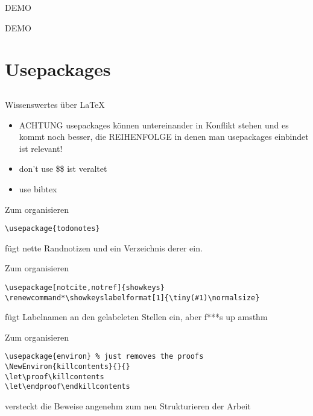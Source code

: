 \documentclass{beamer}
\begin{document}
\begin{frame}{DEMO}
    \begin{center}
        \Huge DEMO
    \end{center}
\end{frame}

\section{Usepackages}
\label{sec:usepackages}

\subsection{}
\begin{frame}{Wissenswertes über LaTeX}
    \begin{itemize}
        \item ACHTUNG usepackages können untereinander in Konflikt stehen und es kommt
              noch besser, die REIHENFOLGE in denen man usepackages einbindet ist
              relevant!
        \item  don't use \$\$ ist veraltet
        \item  use bibtex
    \end{itemize}
\end{frame}

\begin{frame}[fragile]{Zum organisieren}
    \footnotesize
    \begin{verbatim}
\usepackage{todonotes}
\end{verbatim}
    \normalsize
    fügt nette Randnotizen und ein Verzeichnis derer ein.
\end{frame}

\begin{frame}[fragile]{Zum organisieren}
    \footnotesize
    \begin{verbatim}
\usepackage[notcite,notref]{showkeys}
\renewcommand*\showkeyslabelformat[1]{\tiny(#1)\normalsize}
    \end{verbatim}
    \normalsize
fügt Labelnamen an den gelabeleten Stellen ein, aber f***s up amsthm
\end{frame}

\begin{frame}[fragile]{Zum organisieren}
    \footnotesize
    \begin{verbatim}
\usepackage{environ} % just removes the proofs
\NewEnviron{killcontents}{}{}
\let\proof\killcontents
\let\endproof\endkillcontents
    \end{verbatim}
    \normalsize
versteckt die Beweise angenehm zum neu Strukturieren der Arbeit
\end{frame}
\end{document}
